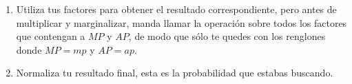 \begin{enumerate}
\begin{enumerate}
  \item Utiliza tus factores para obtener el resultado correspondiente, pero antes de multiplicar y marginalizar, manda llamar la operación  sobre todos los factores que contengan a $MP$ y $AP$, de modo que sólo te quedes con los renglones donde $MP=mp$ y $AP=ap$.
  
  \item Normaliza tu resultado final, esta es la probabilidad que estabas buscando.
 \end{enumerate}


\end{enumerate}
